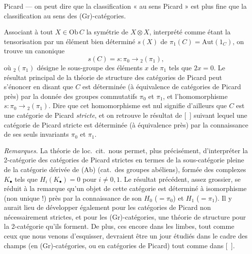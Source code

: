 \documentclass[11pt,a4paper]{article}
\begin{document}
Picard --- on peut dire que la classification « au sens Picard » est plus
fine que la classification au sens des (Gr)-catégories.

Associant à tout $X \in \mathrm{Ob}\, C$ la symétrie de $X \otimes X$,
interprété comme étant la tensorisation par un élément bien déterminé $s(X)$
de $\pi_1(C) = \mathrm{Aut}(1_C)$, on trouve un 
 canonique
\[ s(C) = s : \pi_0 \longrightarrow {}_2(\pi_1) , \]
où ${}_2(\pi_1)$ désigne le sous-groupe des éléments $x$ de $\pi_1$ tels que
$2x = 0$. Le résultat principal de la théorie de structure des catégories de
Picard peut s'énoncer en disant que $C$ est déterminée (à équivalence
 de catégories de Picard près) par la donnée des groupes
commutatifs $\pi_0$ et $\pi_1$, et l'homomorphisme $s : \pi_0 \to
{}_2(\pi_1)$. Dire que cet homomorphisme est nul signifie d'ailleurs que $C$
est une catégorie de Picard \emph{stricte}, et on retrouve le résultat de
[\ ] suivant lequel une catégorie de Picard stricte est déterminée (à
équivalence près) par la connaissance de ses seuls invariants $\pi_0$ et
$\pi_1$.


\emph{Remarques.} La théorie de loc.\ cit.\ nous permet, plus précisément,
d'interpréter la 2-catégorie des catégories de Picard strictes en termes de
la sous-catégorie pleine de la catégorie dérivée de (Ab) (cat.\ des groupes
abéliens), formée des complexes $K_{\bullet}$ tels que $H_i(K_{\bullet}) =
0$ pour $i \neq 0, 1$. Le résultat précédent, assez grossier, se réduit à
la remarque qu'un objet de cette catégorie est déterminé à isomorphisme (non
unique !) près par la connaissance de son $H_0$ ($= \pi_0$) et $H_1$ ($=
\pi_1$). Il y aurait lieu de développer également pour les catégories de
Picard non nécessairement strictes, et pour les (Gr)-catégories, une théorie
de structure pour la 2-catégorie qu'ils forment. De plus, ces
  encore dans les limbes, tout comme
ceux que \struck{\ill{}} nous venons d'esquisser, devraient être un jour
\struck{\ill{}} étudiés dans le cadre des champs (en (Gr)-catégories, ou en
catégories de Picard) tout comme dans  [\ ].

\end{document}
